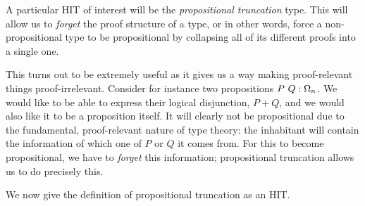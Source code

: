 A particular HIT of interest will be the \emph{propositional truncation} type. This will
allow us to \emph{forget} the proof structure of a type, or in other words, force a
non-propositional type to be propositional by collapsing all of its different proofs into
a single one.

This turns out to be extremely useful as it gives us a way making proof-relevant things
proof-irrelevant. Consider for instance two propositions $P~Q:\Omega_n$. We would
like to be able to express their logical disjunction, $P + Q$, and we would also like it
to be a proposition itself. It will clearly not be propositional due to the fundamental,
proof-relevant nature of type theory: the inhabitant will contain the information of which
one of $P$ or $Q$ it comes from. For this to become propositional, we have to
\emph{forget} this information; propositional truncation allows us to do precisely this.

We now give the definition of propositional truncation as an HIT.

\begin{defn}\label{defn:truncation}
\end{defn}

